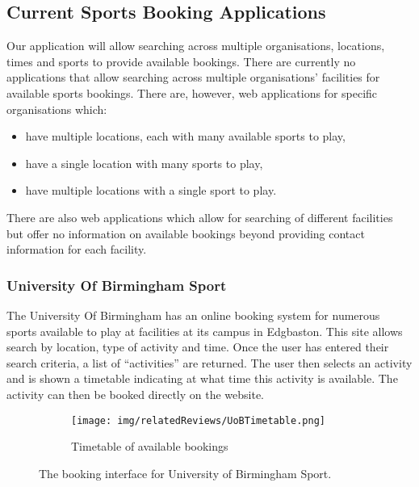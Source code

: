 \subsection{Current Sports Booking Applications}
\label{sub:current_sports_booking_applications}

Our application will allow searching across multiple organisations, locations,
times and sports to provide available bookings. There are currently no
applications that allow searching across multiple organisations' facilities for
available sports bookings. There are, however, web applications for specific
organisations which:
\begin{itemize}
	\item have multiple locations, each with many available sports to play,
	\item have a single location with many sports to play,
	\item have multiple locations with a single sport to play.
\end{itemize}
There are also web applications which allow for searching of different
facilities but offer no information on available bookings beyond providing
contact information for each facility.

\subsubsection{University Of Birmingham Sport}
\label{ssub:university_of_birmingham_sport}

The University Of Birmingham has an online booking system for numerous sports
available to play at facilities at its campus in Edgbaston\cite{UOBSport}. This
site allows search by location, type of activity and time. Once the user has
entered their search criteria, a list of ``activities'' are returned. The user
then selects an activity and is shown a timetable indicating at what time this
activity is available. The activity can then be booked directly on the website.
\begin{figure}[htbp]
	\centering
	\begin{subfigure}[b]{\textwidth}
		\bigskip
		\texttt{[image: img/relatedReviews/UoBTimetable.png]}
		\caption{Timetable of available bookings}\label{fig:UoBTimetable}
	\end{subfigure}
	\caption{The booking interface for University of Birmingham Sport.
	}\label{fig:animals}
\end{figure}

